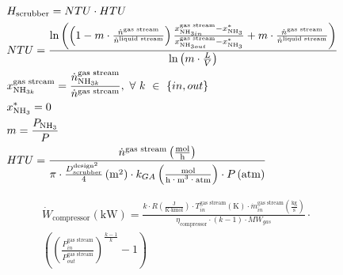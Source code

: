 \begin{refsection}[referencesApD]
\begin{align}	
& H_{\text{scrubber}} = NTU \cdot HTU \label{eq:Hscrubber}
\\
& NTU = \frac{\text{ln}\left(\left(1-m \cdot \frac{\dot{n}^{\text{gas stream}}}{\dot{n}^{\text{liquid stream}}} \right) \frac{x_{\text{NH}_{3 in}}^{\text{gas stream}} - x^*_{\text{NH}_{3}}}{x_{\text{NH}_{3 out}}^{\text{gas stream}} - x^*_{\text{NH}_{3}}} + m \cdot\frac{\dot{n}^{\text{gas stream}}}{\dot{n}^{\text{liquid stream}}}\right)}{\text{ln}\left(m \cdot \frac{L}{V}\right)}\label{eq:Kremser}
\\
&
x_{\text{NH}_{3 k}}^{\text{gas stream}} = \frac{\dot{n}_{\text{NH}_{3 k}}^{\text{gas stream}}}{\dot{n}^{\text{gas stream}}}, \ \forall \ k \ \in \ \{in, out\}
\\
&
x^*_{\text{NH}_{3}} = 0
\\
&
m = \frac{P_{\text{NH}_3}}{P}
\\
& HTU = \frac{\dot{n}^{\text{gas stream}} \left(\frac{\text{mol}}{\text{h}}\right)}{\pi \cdot \frac{D_{\text{scrubber}}^{\text{design}^2}}{4} \left(\text{m}^2\right)\cdot k_{GA} \left(\frac{\text{mol}}{\text{h·m\textsuperscript{3}·atm}}\right)\cdot P \left(\text{atm}\right)}\label{eq:HTU}
\end{align}

\begin{align}
&\dot{W}_{\text{compressor}} \left(\text{kW}\right) = \frac{k \cdot R \left(\frac{\text{J}}{\text{K} \cdot \text{kmol}}\right) \cdot T_{in}^{\text{gas stream}} \left(\text{K}\right) \cdot \dot{m}_{in}^{\text{gas stream}} \left(\frac{\text{kg}}{\text{s}}\right)}{\eta_{\text{compressor}} \cdot \left(k-1\right) \cdot MW_{gas}} \cdot \nonumber \\
&\left(\left(\frac{P_{in}^{\text{gas stream}}}{P_{out}^{\text{gas stream}}}\right)^{\frac{k-1}{k}}-1\right) \label{eq:CompressorEnergy}
\end{align}


\end{refsection}
